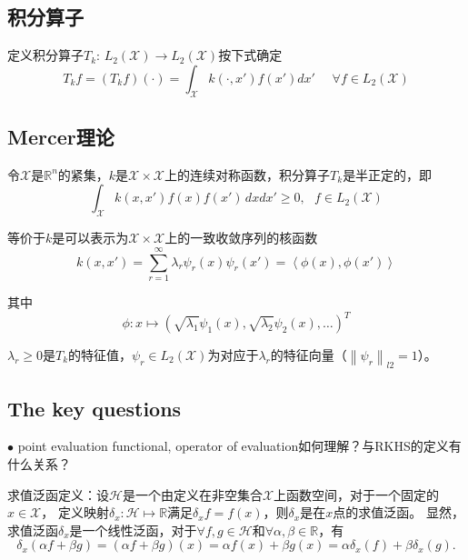 \documentclass{ctexart}
\begin{document}
    \subsection{积分算子}
    定义积分算子$T_k$: $L_2(\mathcal{X})\rightarrow L_2(\mathcal{X})$按下式确定
    \begin{equation}
        T_{k}f = (T_{k}f)(\cdot) = \int_{\mathcal{X}}k(\cdot, x')f(x')dx' \,\,\,\,\,\,\,\, \forall f\in L_2(\mathcal{X})
    \end{equation}

    \subsection{Mercer理论}
    令$\mathcal{X}$是$\mathbb{R}^n$的紧集，$k$是$\mathcal{X}\times\mathcal{X}$上的连续对称函数，积分算子$T_k$是半正定的，即
    \begin{equation}
        \int_{\mathcal{X}} k(x, x')f(x)f(x')  \,dxdx' \geq 0, \,\,\,\,f\in L_2(\mathcal{X})
    \end{equation}

    等价于$k$是可以表示为$\mathcal{X}\times\mathcal{X}$上的一致收敛序列的核函数
    \begin{equation}
        k(x, x') = \sum_{r=1}^{\infty}\lambda_r\psi_r(x)\psi_r(x') = \left<\phi(x), \phi(x')\right> 
    \end{equation}

    其中
    \begin{equation}
        \phi: x \mapsto {\left(\sqrt{\lambda_1}\psi_1(x), \sqrt{\lambda_2}\psi_2(x), \dots\right)}^T
    \end{equation}

    $\lambda_r \geq 0$是$T_k$的特征值，$\psi_r\in{L_2(\mathcal{X})}$为对应于$\lambda_r$的特征向量（$\left\lVert \psi_r \right\rVert_{l2}=1$）。

    \subsection{The key questions}
    $\bullet$ point evaluation functional, operator of evaluation如何理解？与RKHS的定义有什么关系？

    求值泛函定义：设$\mathcal{H}$是一个由定义在非空集合$\mathcal{X}$上函数空间，对于一个固定的$x\in\mathcal{X}$，
    定义映射$\delta_x: \mathcal{H} \mapsto \mathbb{R}$满足$\delta_{x}f=f(x)$，则$\delta_x$是在$x$点的求值泛函。
    显然，求值泛函$\delta_x$是一个线性泛函，对于$\forall f, g\in\mathcal{H}$和$\forall \alpha, \beta\in \mathbb{R}$，有
    \[\delta_{x}(\alpha{f} + \beta{g}) = (\alpha{f} + \beta{g})(x) = \alpha{f(x)} + \beta{g(x)} = \alpha\delta_{x}(f) + \beta\delta_{x}(g).\]
\end{document}
